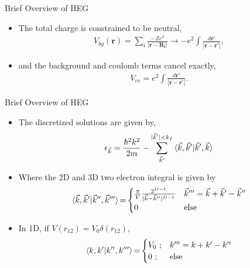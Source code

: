 \documentclass[10pt]{beamer}
\begin{document}
{{{{{\begin{frame}{Brief Overview of HEG}
\begin{itemize}
		\item{The total charge is constrained to be neutral,}
			\begin{eqnarray}
				V_{bg}(\mathbf{r}) = \sum\limits_{i} \frac{-Ze^2}{|\mathbf{r}-\mathbf{R_i}|} \rightarrow -e^2 \int \frac{d\mathbf{r'}}{|\mathbf{r}-\mathbf{r'}|},
			\end{eqnarray}
		\item{and the background and coulomb terms cancel exactly,
			\begin{eqnarray}
				V_{ee} = e^2 \int \frac{d\mathbf{r'}}{|\mathbf{r}-\mathbf{r'}|}.
			\end{eqnarray}
		}
	\end{itemize}
\end{frame}

{%

\begin{frame}{Brief Overview of HEG}
	\begin{itemize}
		\item{The discretized solutions are given by,
		\begin{eqnarray}\label{eq:hf_orb_energy}
			\epsilon_{\vec{k}}=
				\frac{\hbar^2 k^2}{2m} - \sum\limits_{\vec{k}'}^{|\vec{k}'|< k_f}
				\braket{\vec{k}, \vec{k}' |\vec{k}', \vec{k}}
		\end{eqnarray}
		}
		\item{Where the 2D and 3D two electron integral is given by
  		\begin{equation}
  			\braket{\vec{k}, \vec{k}'|\vec{k}'',\vec{k}'''}{=}
  				\begin{cases}
  				\frac{\pi}{V}\frac{2^{D-1}}{|\vec{k}-\vec{k}''|^{D-1}}
  				& \vec{k}''' = \vec{k}+\vec{k}'-\vec{k}'' \nonumber\\
  				0
  				& \text{else}
  				\end{cases}
  		\end{equation}
		}
		\item{ In 1D, if $V(r_{12}) = V_0\delta{(r_{12})}$,
		  \begin{equation}
  			\braket{k, k'|k'',k'''}{=}
  				\begin{cases}
  				V_0\text{ ;}
  				& k''' = k+k'-k'' \\
  				0\text{ ;}
  				& \text{else}
  				\end{cases}
		  \end{equation}
		}
	\end{itemize}
\end{frame}

}}}}}}
\end{document}
